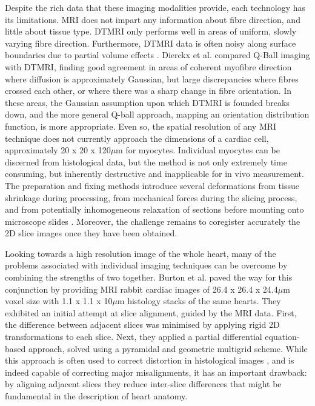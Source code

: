     Despite the rich data that these imaging modalities provide, each technology has its limitations. MRI does not impart any information about fibre direction, and little about tissue type. DTMRI only performs well in areas of uniform, slowly varying fibre direction. Furthermore, DTMRI data is often noisy along surface boundaries due to partial volume effects \cite{Alexander:2001p941}. Dierckx et al. \cite{Dierckx:2009p663} compared Q-Ball imaging with DTMRI, finding good agreement in areas of coherent myofibre direction where diffusion is approximately Gaussian, but large discrepancies where fibres crossed each other, or where there was a sharp change in fibre orientation. In these areas, the Gaussian assumption upon which DTMRI is founded breaks down, and the more general Q-ball approach, mapping an orientation distribution function, is more appropriate. Even so, the spatial resolution of any MRI technique does not currently approach the dimensions of a cardiac cell, approximately 20 x 20 x 120$\mu$m for myocytes. Individual myocytes can be discerned from histological data, but the method is not only extremely time consuming, but inherently destructive and  inapplicable for in vivo measurement. The preparation and fixing methods introduce several deformations from tissue shrinkage during processing, from mechanical forces during the slicing process, and from potentially inhomogeneous relaxation of sections before mounting onto microscope slides \cite{Burton:2006p100}. Moreover, the challenge remains to coregister accurately the 2D slice images once they have been obtained.
    
    Looking towards a high resolution image of the whole heart, many of the problems associated with individual imaging techniques can be overcome by combining the strengths of two together. Burton et al. paved the way for this conjunction by providing \cite{Burton:2006p100} MRI rabbit cardiac images of 26.4 x 26.4 x 24.4$\mu$m voxel size with 1.1 x 1.1 x 10$\mu$m histology stacks of the same hearts. They exhibited an initial attempt at slice alignment, guided by the MRI data. First, the difference between adjacent slices was minimised by applying rigid 2D transformations to each slice. Next, they applied a partial differential equation-based approach, solved using a pyramidal and geometric multigrid scheme. While this approach is often used to correct distortion in histological images \cite{Keeling:2005p943}, and is indeed capable of correcting major misalignments, it has an important drawback: by aligning adjacent slices they reduce inter-slice differences that might be fundamental in the description of heart anatomy.
  
